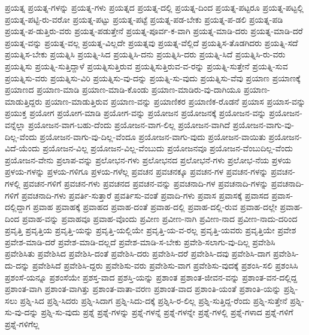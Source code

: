 {ಪ್ರಯತ್ನ
ಪ್ರಯತ್ನ-ಗಳನ್ನು
ಪ್ರಯತ್ನ-ಗಳು
ಪ್ರಯತ್ನದ
ಪ್ರಯತ್ನ-ದಲ್ಲಿ
ಪ್ರಯತ್ನ-ದಿಂದ
ಪ್ರಯತ್ನ-ಪಟ್ಟರೂ
ಪ್ರಯತ್ನ-ಪಟ್ಟಲ್ಲಿ
ಪ್ರಯತ್ನ-ಪಟ್ಟಿ-ರು-ವರೋ
ಪ್ರಯತ್ನ-ಪಟ್ಟು
ಪ್ರಯತ್ನ-ಪಟ್ಟೆ
ಪ್ರಯತ್ನ-ಪಡ-ಬೇಕು
ಪ್ರಯತ್ನ-ಪ-ಡಲಿ
ಪ್ರಯತ್ನ-ಪಡಿ
ಪ್ರಯತ್ನ-ಪ-ಡುತ್ತಿರು-ವರು
ಪ್ರಯತ್ನ-ಪಡುತ್ತೇನೆ
ಪ್ರಯತ್ನ-ಪೂರ್ವ-ಕ-ವಾಗಿ
ಪ್ರಯತ್ನ-ಮಾಡಿ-ದರು
ಪ್ರಯತ್ನ-ಮಾಡಿ-ದರೆ
ಪ್ರಯತ್ನ-ವನ್ನು
ಪ್ರಯತ್ನ-ವಲ್ಲ
ಪ್ರಯತ್ನ-ವಿಲ್ಲದೇ
ಪ್ರಯತ್ನವು
ಪ್ರಯತ್ನ-ವೆಲ್ಲಿದೆ
ಪ್ರಯತ್ನಿಸ-ತೊಡಗಿದರು
ಪ್ರಯತ್ನಿ-ಸದೆ
ಪ್ರಯತ್ನಿಸ-ಬೇಕು
ಪ್ರಯತ್ನಿಸಿ
ಪ್ರಯತ್ನಿ-ಸಿದ
ಪ್ರಯತ್ನಿಸಿ-ದನು
ಪ್ರಯತ್ನಿಸಿ-ದರು
ಪ್ರಯತ್ನಿ-ಸಿದೆ
ಪ್ರಯತ್ನಿಸಿ-ರು-ವರು
ಪ್ರಯತ್ನಿಸು
ಪ್ರಯತ್ನಿ-ಸುತ್ತಿದ್ದಾಳೆ
ಪ್ರಯತ್ನಿಸುತ್ತಿರುವ
ಪ್ರಯತ್ನಿಸುತ್ತಿರುವ-ವ-ರನ್ನು
ಪ್ರಯತ್ನಿ-ಸುತ್ತೇನೆ
ಪ್ರಯತ್ನಿ-ಸುವ
ಪ್ರಯತ್ನಿಸು-ವರು
ಪ್ರಯತ್ನಿಸು-ವಿರಿ
ಪ್ರಯತ್ನಿಸು-ವು-ದನ್ನು
ಪ್ರಯತ್ನಿ-ಸು-ವುದು
ಪ್ರಯತ್ನಿಸು-ವೆವು
ಪ್ರಯಾಣ
ಪ್ರಯಾಣಕ್ಕೆ
ಪ್ರಯಾಣದ
ಪ್ರಯಾಣ-ಮಾಡಿ
ಪ್ರಯಾಣ-ಮಾಡಿ-ಕೊಂಡು
ಪ್ರಯಾಣ-ಮಾಡಿರು-ವು-ದಾಗಿಯೂ
ಪ್ರಯಾಣ-ಮಾಡುತ್ತಿದ್ದರು
ಪ್ರಯಾಣ-ಮಾಡುತ್ತಿರುವ
ಪ್ರಯಾಣ-ವನ್ನು
ಪ್ರಯಾಣಿಕರ
ಪ್ರಯಾಣಿಕ-ರೊಡನೆ
ಪ್ರಯಾಸ
ಪ್ರಯಾಸ-ವನ್ನು
ಪ್ರಯುಕ್ತ
ಪ್ರಯೋಗ
ಪ್ರಯೋಗ-ಮಾಡಿ
ಪ್ರಯೋಗ-ವನ್ನು
ಪ್ರಯೋಜನ
ಪ್ರಯೋಜನಕ್ಕೆ
ಪ್ರಯೋಜನ-ವನ್ನು
ಪ್ರಯೋಜನ-ವನ್ನೆಲ್ಲಾ
ಪ್ರಯೋಜನ-ವಾಗ-ಬಹು-ದೆಂದು
ಪ್ರಯೋಜನ-ವಾಗ-ಲಿಲ್ಲ
ಪ್ರಯೋಜನ-ವಾಗಿದೆ
ಪ್ರಯೋಜನ-ವಾಗು-ವು-ದಿಲ್ಲ-ವೆಂದು
ಪ್ರಯೋಜನ-ವಾಗು-ವು-ದಿಲ್ಲ-ವೆಂದೂ
ಪ್ರಯೋಜನ-ವಾಗು-ವುದು
ಪ್ರಯೋಜನ-ವಾಯಿತು
ಪ್ರಯೋಜನ-ವಿದೆ-ಯೆಂದು
ಪ್ರಯೋಜನ-ವಿಲ್ಲ
ಪ್ರಯೋಜನ-ವಿಲ್ಲ-ವೆಂಬುದು
ಪ್ರಯೋಜನವೂ
ಪ್ರಯೋಜನ-ವೆಂಬುದಿಲ್ಲ-ವೆಂದು
ಪ್ರಯೋಜನ-ವೇನು
ಪ್ರಲಾಪ-ವನ್ನು
ಪ್ರಲೋಭನ-ಗಳು
ಪ್ರಲೋಭನದ
ಪ್ರಲೋಭನೆ-ಗಳು
ಪ್ರಲೋಭ-ನೆಯ
ಪ್ರಳಯ
ಪ್ರಳಯ-ಗಳನ್ನು
ಪ್ರಳಯ-ಗಳಿಗೂ
ಪ್ರಳಯ-ಗಳೆಲ್ಲ
ಪ್ರವಚನ
ಪ್ರವಚನಕ್ಕೂ
ಪ್ರವಚನ-ಗಳ
ಪ್ರವಚನ-ಗಳನ್ನು
ಪ್ರವಚನ-ಗಳಲ್ಲಿ
ಪ್ರವಚನ-ಗಳಿಗೆ
ಪ್ರವಚನ-ಗಳು
ಪ್ರವಚನದ
ಪ್ರವಚನ-ವನ್ನು
ಪ್ರವಚನಾದಿ-ಗಳ
ಪ್ರವಚನಾದಿ-ಗಳನ್ನು
ಪ್ರವಚನಾದಿ-ಗಳಿಗೆ
ಪ್ರವಚನಾದಿ-ಗಳು
ಪ್ರವರ್ತಿ-ಸುತ್ತಾರೆ
ಪ್ರವರ್ತಿಸು-ವಂತೆ
ಪ್ರವಾದಿ-ಗಳು
ಪ್ರವಾಸ
ಪ್ರವಾಸಕ್ಕೆ
ಪ್ರವಾಸದ
ಪ್ರವಾಸ-ದಲ್ಲಿದ್ದಾಗ
ಪ್ರವಾಹ
ಪ್ರವಾಹಕ್ಕೆ
ಪ್ರವಾಹದ
ಪ್ರವಾಹ-ದಂತೆ
ಪ್ರವಾಹ-ದಲ್ಲಿ
ಪ್ರವಾಹ-ದಲ್ಲಿ-ರುವ
ಪ್ರವಾಹ-ದಲ್ಲೇ
ಪ್ರವಾಹ-ದಿಂದ
ಪ್ರವಾಹ-ವನ್ನು
ಪ್ರವಾಹವೂ
ಪ್ರವಾಹ-ವೊಂದು
ಪ್ರವೀಣ
ಪ್ರವೀಣ-ನಾಗಿ
ಪ್ರವೀಣ-ನಾದ
ಪ್ರವೀಣ-ನಾದು-ದರಿಂದ
ಪ್ರವೃತ್ತಿ
ಪ್ರವೃತ್ತಿಯ
ಪ್ರವೃತ್ತಿ-ಯನ್ನು
ಪ್ರವೃತ್ತಿ-ಯಲ್ಲಿಯೇ
ಪ್ರವೃತ್ತಿ-ಯ-ವ-ರಲ್ಲ
ಪ್ರವೃತ್ತಿ-ಯವರು
ಪ್ರವೃತ್ತಿಯೇ
ಪ್ರವೇಶ
ಪ್ರವೇಶ-ಮಾಡಿ-ದರೆ
ಪ್ರವೇಶ-ಮಾಡಿ-ದಲ್ಲದೆ
ಪ್ರವೇಶ-ಮಾಡಿ-ಸ-ಬೇಕು
ಪ್ರವೇಶಿ-ಸಲಾಗು-ವು-ದಿಲ್ಲ
ಪ್ರವೇಶಿಸಿ
ಪ್ರವೇಶಿಸಿತು
ಪ್ರವೇಶಿಸಿದ
ಪ್ರವೇಶಿಸಿ-ದಂತೆ
ಪ್ರವೇಶಿಸಿ-ದರು
ಪ್ರವೇಶಿಸಿ-ದರೆ
ಪ್ರವೇಶಿಸಿ-ದವು
ಪ್ರವೇಶಿಸಿ-ದಾಗ
ಪ್ರವೇಶಿಸಿ-ದು-ದನ್ನು
ಪ್ರವೇಶಿಸಿದೆ
ಪ್ರವೇಶಿಸಿ-ದ್ದರು
ಪ್ರವೇಶಿಸು-ವರು
ಪ್ರವೇಶಿಸು-ವಾಗ
ಪ್ರವೇಶಿಸು-ವುದಕ್ಕೆ
ಪ್ರಶಂಸಿ-ಸಲಿ
ಪ್ರಶಂಸಿಸಿ
ಪ್ರಶಂಸೆ-ಯನ್ನೂ
ಪ್ರಶಂಸೆಯೇ
ಪ್ರಶಸ್ತ-ವಾದ
ಪ್ರಶಸ್ತಿ-ಯನ್ನು
ಪ್ರಶಾಂತ
ಪ್ರಶಾಂತ-ಜೀವನ-ವನ್ನು
ಪ್ರಶಾಂತ-ವನ-ದಲ್ಲಿದ್ದ
ಪ್ರಶಾಂತ-ವಾಗಿ
ಪ್ರಶಾಂತ-ವಾಗಿತ್ತು
ಪ್ರಶಾಂತ-ವಾತಾ-ವರಣ
ಪ್ರಶಾಂತ-ವಾದ
ಪ್ರಶಾಂತಿ-ಯಂತೆ
ಪ್ರಶಾಂತಿ-ಯನ್ನು
ಪ್ರಶ್ನಿ-ಸಲು
ಪ್ರಶ್ನಿ-ಸಿದ
ಪ್ರಶ್ನಿ-ಸಿದರು
ಪ್ರಶ್ನಿ-ಸಿದಾಗ
ಪ್ರಶ್ನಿ-ಸಿದು-ದಕ್ಕೆ
ಪ್ರಶ್ನಿಸಿ-ರ-ಲಿಲ್ಲ
ಪ್ರಶ್ನಿ-ಸುತ್ತಿದ್ದ-ರೆಂದು
ಪ್ರಶ್ನಿ-ಸುತ್ತೇನೆ
ಪ್ರಶ್ನಿ-ಸು-ವು-ದನ್ನು
ಪ್ರಶ್ನಿ-ಸು-ವುದು
ಪ್ರಶ್ನೆ
ಪ್ರಶ್ನೆ-ಗಳನ್ನು
ಪ್ರಶ್ನೆ-ಗಳನ್ನೆ
ಪ್ರಶ್ನೆ-ಗಳನ್ನೇ
ಪ್ರಶ್ನೆ-ಗಳಲ್ಲಿ
ಪ್ರಶ್ನೆ-ಗಳಾದ
ಪ್ರಶ್ನೆ-ಗಳಿಗೆ
ಪ್ರಶ್ನೆ-ಗಳಿಗೆಲ್ಲ
}
